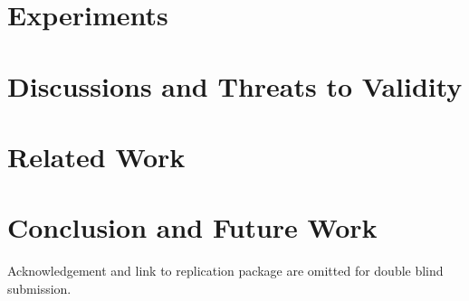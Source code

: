 \documentclass[sigconf]{acmart}
\begin{document}
\section{Experiments}\label{sec.exp}


\section{Discussions and Threats to Validity}\label{sec.discuss}


\section{Related Work}\label{sec.related}


\section{Conclusion and Future Work}\label{sec.conclusion}


\vspace{0.2cm} Acknowledgement and link to replication package are omitted for double blind submission.

\pagebreak
\balance


\end{document}
